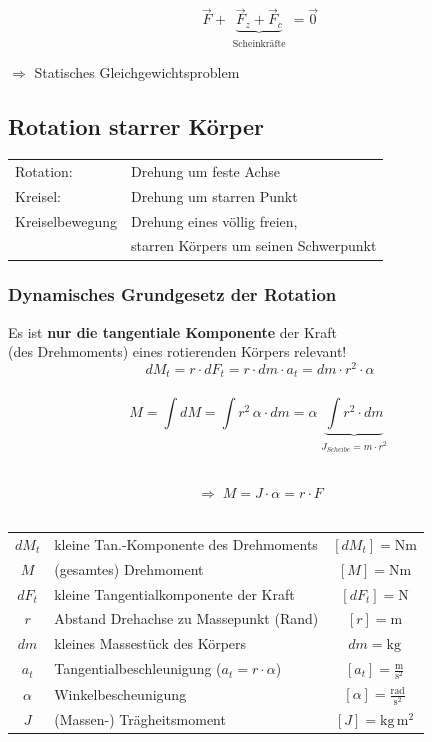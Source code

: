 			$$ \boxed{ \vec{F} + \underbrace{ \vec{F}_z + \vec{F}_c }_{\substack{\text{Scheinkräfte}}} = \vec{0} }$$ 
			
			$\Rightarrow$ Statisches Gleichgewichtsproblem

	\subsection{Rotation starrer Körper}
	
		\begin{tabular}{ll}
			Rotation: & Drehung um feste Achse \\
			Kreisel: & Drehung um starren Punkt \\
			Kreiselbewegung & Drehung eines völlig freien, \\
			&  starren Körpers um seinen Schwerpunkt \\
		\end{tabular}

		\subsubsection{Dynamisches Grundgesetz der Rotation}
			Es ist \textbf{nur die tangentiale Komponente} der Kraft \\
			(des Drehmoments) eines rotierenden Körpers relevant! \\
			\vspace{-0.2cm}
			$$dM_t = r \cdot dF_t = r \cdot dm \cdot a_t = dm \cdot r^2 \cdot \alpha$$ \\
			\vspace{-0.2cm}
			$$ \boxed{ M = \int dM = \int r^2 \, \alpha \cdot dm = \alpha  \underbrace{  \int r^2 \cdot dm }_{\substack{J_{Scheibe} = m \cdot r^2}} }$$ \

			$$ \boxed{ \Rightarrow \; M = J \cdot \alpha = r \cdot F} $$ \\
			\vspace{-0.2cm}
			\begin{tabular}{c l c}
				$dM_t$ & kleine Tan.-Komponente des Drehmoments & $[dM_t] = \mathrm{Nm}$ \\
				$M$ & (gesamtes) Drehmoment & $[M] = \mathrm{Nm}$ \\
				$dF_t$ & kleine Tangentialkomponente der Kraft & $[dF_t] = \mathrm{N}$ \\
				$r$ & Abstand Drehachse zu Massepunkt (Rand) & $[r] = \mathrm{m}$ \\
				$dm$ & kleines Massestück des Körpers & $dm = \mathrm{kg}$ \\
				$a_t$ & Tangentialbeschleunigung ($a_t = r \cdot \alpha$) & $[a_t] = \mathrm{\frac{m}{s^2}}$ \\
				$\alpha$ & Winkelbescheunigung & $[\alpha] = \mathrm{\frac{rad}{s^2}}$ \\
				$J$ & (Massen-) Trägheitsmoment & $[J] = \mathrm{kg \, m^2}$ \\
			\end{tabular}

